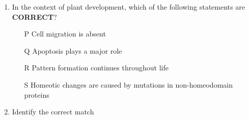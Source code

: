 \documentclass[journal,12pt,onecolumn]{IEEEtran}
\theoremstyle{remark}
\begin{document}
\begin{enumerate}
\begin{enumerate}
\end{enumerate}



\item In the context of plant development, which of the following statements are \textbf{CORRECT}?
\begin{enumerate}
     
\item[P] Cell migration is absent \\
\item[Q] Apoptosis plays a major role \\
\item[R] Pattern formation continues throughout life \\
\item[S] Homeotic changes are caused by mutations in non-homeodomain proteins
\end{enumerate}
\hfill{}
\begin{enumerate}
\end{enumerate}

 \item Identify the correct match


\end{enumerate}
\end{document}
